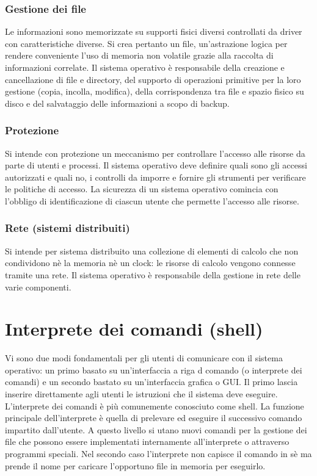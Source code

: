 \subsubsection{Gestione dei file}
Le informazioni sono memorizzate su supporti fisici diversi controllati da driver con caratteristiche diverse. Si crea pertanto un file, un'astrazione logica per rendere conveniente l'uso di memoria non volatile 
grazie alla raccolta di informazioni correlate. Il sistema operativo \`e responsabile della creazione e cancellazione di file e directory, del supporto di operazioni primitive per la loro gestione (copia, incolla, modifica), 
della corrispondenza tra file e spazio fisico su disco e del salvataggio delle informazioni a scopo di backup. 
\subsubsection{Protezione}
Si intende con protezione un meccanismo per controllare l'accesso alle risorse da parte di utenti e processi. Il sistema operativo deve definire quali sono gli accessi autorizzati e quali no, i controlli da imporre e fornire gli 
strumenti per verificare le politiche di accesso. La sicurezza di un sistema operativo comincia con l'obbligo di identificazione di ciascun utente che permette l'accesso alle risorse.  
\subsubsection{Rete (sistemi distribuiti)}
Si intende per sistema distribuito una collezione di elementi di calcolo che non condividono n\`e la memoria n\`e un clock: le risorse di calcolo vengono connesse tramite una rete. Il sistema operativo \`e 
responsabile della gestione in rete delle varie componenti.
\section{Interprete dei comandi (shell)}
Vi sono due modi fondamentali per gli utenti di comunicare con il sistema operativo: un primo basato su un'interfaccia a riga d comando (o interprete dei comandi) e un secondo bastato su un'interfaccia grafica o GUI. Il primo lascia
inserire direttamente agli utenti le istruzioni che il sistema deve eseguire. L'interprete dei comandi \`e pi\`u comunemente conosciuto come shell. La funzione principale dell'interprete \`e quella di prelevare ed eseguire il successivo
comando impartito dall'utente. A questo livello si utano nuovi comandi per la gestione dei file che possono essere implementati internamente all'interprete o attraverso programmi speciali. Nel secondo caso l'interprete non capisce il
comando in s\`e ma prende il nome per caricare l'opportuno file in memoria per eseguirlo.
